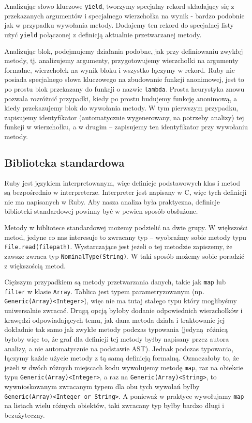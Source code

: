 \documentclass[declaration,shortabstract]{iithesis}
\begin{document}
Analizując słowo kluczowe \texttt{yield}, tworzymy specjalny rekord składający się z przekazanych argumentów i specjalnego wierzchołka na wynik - bardzo podobnie jak w przypadku wywołania metody. Dodajemy ten rekord do specjalnej listy użyć \texttt{yield} połączonej z definicją aktualnie przetwarzanej metody.

Analizując blok, podejmujemy działania podobne, jak przy definiowaniu zwykłej metody, tj. analizujemy argumenty, przygotowujemy wierzchołki na argumenty formalne, wierzchołek na wynik bloku i wszystko łączymy w rekord. Ruby nie posiada specjalnego słowa kluczowego na zbudowanie funkcji anonimowej, jest to po prostu blok przekazany do funkcji o nazwie \texttt{lambda}. Prosta heurystyka znowu pozwala rozróżnić przypadki, kiedy po prostu budujemy funkcję anonimową, a kiedy przekazujemy blok do wywołania metody. W tym pierwszym przypadku, zapisujemy identyfikator (automatycznie wygenerowany, na potrzeby analizy) tej funkcji w wierzchołku, a w drugim -- zapisujemy ten identyfikator przy wywołaniu metody.


\subsection{Biblioteka standardowa}

Ruby jest językiem interpretowanym, więc definicje podstawowych klas i metod są bezpośrednio w interpreterze. Interpreter jest napisany w C, więc tych definicji nie ma napisanych w Ruby. Aby nasza analiza była praktyczna, definicje biblioteki standardowej powinny być w pewien sposób obsłużone.

Metody w bibliotece standardowej możemy podzielić na dwie grupy. W większości metod, jedyne co nas interesuje to zwracany typ -- wyobraźmy sobie metody typu \texttt{File.read(filepath)}. Wystarczające jest jeżeli o tej metodzie zapiszemy, że zawsze zwraca typ \texttt{NominalType(String)}. W taki sposób możemy sobie poradzić z większością metod.

Cięższym przypadkiem są metody przetwarzania danych, takie jak \texttt{map} lub \texttt{filter} w klasie \texttt{Array}. Tablica jest typem parametryzowanym (np. \texttt{Generic(Array)<Integer>}), więc nie ma tutaj stałego typu który moglibyśmy uniwersalnie zwracać. Drugą opcją byłoby dodanie odpowiednich wierzchołków i krawędzi odpowiadających temu, jak dana metoda działa i traktowanie jej dokładnie tak samo jak zwykłe metody podczas typowania (jedyną różnicą byłoby więc to, że graf dla definicji tej metody byłby napisany przez autora analizy, a nie automatycznie na podstawie AST). Jednak podczas typowania, łączymy każde użycie metody z tą samą definicją formalną. Oznaczałoby to, że jeżeli w dwóch różnych miejscach kodu wywołujemy metodę \texttt{map}, raz na obiekcie typu \texttt{Generic(Array)<Integer>}, a raz na \texttt{Generic(Array)<String>}, to wywnioskowanym zwracanym typem dla obu tych wywołań byłby \texttt{Generic(Array)<Integer or String>}. A ponieważ w praktyce wywołujamy \texttt{map} na listach wielu różnych obiektów, taki zwracany typ byłby bardzo długi i bezużyteczny.
\end{document}
